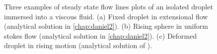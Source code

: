\begin{figure}
    \centering
    \caption{Three examples of steady state flow lines plots of an isolated droplet immersed into a viscous fluid. 
    (a) Fixed droplet in extensional flow (analytical solution in \ref{chap:daniel2}).
    (b) Rising sphere in uniform stokes flow (analytical solution in \ref{chap:daniel2}). 
    (c) Deformed droplet in rising motion (analytical solution of \citet{taylor1964deformation}). }
    \label{fig:flowlines1}
\end{figure} 

